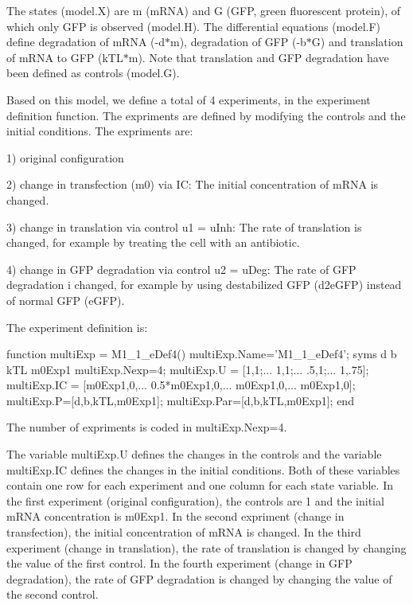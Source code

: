 The states (model.\+X) are m (m\+R\+NA) and G (G\+FP, green fluorescent protein), of which only G\+FP is observed (model.\+H). The differential equations (model.\+F) define degradation of m\+R\+NA (-\/d$\ast$m), degradation of G\+FP (-\/b$\ast$G) and translation of m\+R\+NA to G\+FP (k\+T\+L$\ast$m). Note that translation and G\+FP degradation have been defined as controls (model.\+G).

Based on this model, we define a total of 4 experiments, in the experiment definition function. The expriments are defined by modifying the controls and the initial conditions. The expriments are\+:

1) original configuration

2) change in transfection (m0) via IC\+: The initial concentration of m\+R\+NA is changed.

3) change in translation via control u1 = u\+Inh\+: The rate of translation is changed, for example by treating the cell with an antibiotic.

4) change in G\+FP degradation via control u2 = u\+Deg\+: The rate of G\+FP degradation i changed, for example by using destabilized G\+FP (d2e\+G\+FP) instead of normal G\+FP (e\+G\+FP).

The experiment definition is\+:


\begin{DoxyCode}
\textcolor{keyword}{function} multiExp = M1\_1\_eDef4()
    multiExp.Name='M1\_1\_eDef4';
    syms d b kTL m0Exp1
    multiExp.Nexp=4;
    multiExp.U = [1,1;...
                  1,1;...
                  .5,1;...
                  1,.75];
    multiExp.IC = [m0Exp1,0,...
                   0.5*m0Exp1,0,...
                   m0Exp1,0,...
                   m0Exp1,0];
    multiExp.P=[d,b,kTL,m0Exp1];
    multiExp.Par=[d,b,kTL,m0Exp1];
end
\end{DoxyCode}


The number of expriments is coded in multi\+Exp.\+Nexp=4.

The variable multi\+Exp.\+U defines the changes in the controls and the variable multi\+Exp.\+IC defines the changes in the initial conditions. Both of these variables contain one row for each experiment and one column for each state variable. In the first experiment (original configuration), the controls are 1 and the initial m\+R\+NA concentration is m0\+Exp1. In the second expriment (change in transfection), the initial concentration of m\+R\+NA is changed. In the third experiment (change in translation), the rate of translation is changed by changing the value of the first control. In the fourth experiment (change in G\+FP degradation), the rate of G\+FP degradation is changed by changing the value of the second control.


